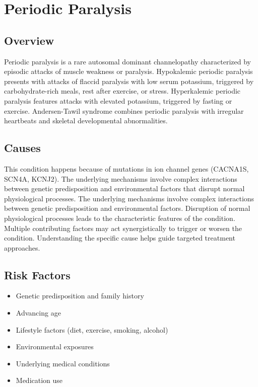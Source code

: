 \chapter{Periodic Paralysis}
\label{sec:Periodic Paralysis}

\section{Overview}
Periodic paralysis is a rare autosomal dominant channelopathy characterized by episodic attacks of muscle weakness or paralysis. Hypokalemic periodic paralysis presents with attacks of flaccid paralysis with low serum potassium, triggered by carbohydrate-rich meals, rest after exercise, or stress. Hyperkalemic periodic paralysis features attacks with elevated potassium, triggered by fasting or exercise. Andersen-Tawil syndrome combines periodic paralysis with irregular heartbeats and skeletal developmental abnormalities.
\section{Causes}
This condition happens because of mutations in ion channel genes (CACNA1S, SCN4A, KCNJ2). The underlying mechanisms involve complex interactions between genetic predisposition and environmental factors that disrupt normal physiological processes. The underlying mechanisms involve complex interactions between genetic predisposition and environmental factors. Disruption of normal physiological processes leads to the characteristic features of the condition. Multiple contributing factors may act synergistically to trigger or worsen the condition. Understanding the specific cause helps guide targeted treatment approaches.
\section{Risk Factors}


\begin{itemize}[noitemsep]
  \item Genetic predisposition and family history
  \item Advancing age
  \item Lifestyle factors (diet, exercise, smoking, alcohol)
  \item Environmental exposures
  \item Underlying medical conditions
  \item Medication use
\end{itemize}
